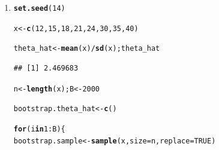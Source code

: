 \documentclass[11pt, a4paper]{article}\usepackage[]{graphicx}\usepackage[]{xcolor}
\makeatletter
\newcommand{\hlnum}[1]{\textcolor[rgb]{0.686,0.059,0.569}{#1}}%
\newcommand{\hlopt}[1]{\textcolor[rgb]{0,0,0}{#1}}%
\newcommand{\hldef}[1]{\textcolor[rgb]{0.345,0.345,0.345}{#1}}%
\newcommand{\hlkwa}[1]{\textcolor[rgb]{0.161,0.373,0.58}{\textbf{#1}}}%
\newcommand{\hlkwb}[1]{\textcolor[rgb]{0.69,0.353,0.396}{#1}}%
\newcommand{\hlkwc}[1]{\textcolor[rgb]{0.333,0.667,0.333}{#1}}%
\newcommand{\hlkwd}[1]{\textcolor[rgb]{0.737,0.353,0.396}{\textbf{#1}}}%
\newenvironment{kframe}{%
 \def\at@end@of@kframe{}%
 \ifinner\ifhmode%
  \def\at@end@of@kframe{\end{minipage}}%
  \begin{minipage}{\columnwidth}%
 \fi\fi%
 \def\FrameCommand##1{\hskip\@totalleftmargin \hskip-\fboxsep
 \colorbox{shadecolor}{##1}\hskip-\fboxsep
     \hskip-\linewidth \hskip-\@totalleftmargin \hskip\columnwidth}%
 \MakeFramed {\advance\hsize-\width
   \@totalleftmargin\z@ \linewidth\hsize
   \@setminipage}}%
 {\par\unskip\endMakeFramed%
 \at@end@of@kframe}
\newenvironment{knitrout}{}{} %
\makeatother
\begin{document}
\begin{enumerate}

\item[\scalebox{2.0}{\twemoji{keycap: 1}}]



\begin{knitrout}
\color{fgcolor}\begin{kframe}
\begin{alltt}
\hlkwd{set.seed}\hldef{(}\hlnum{14}\hldef{)}
\end{alltt}
\end{kframe}
\end{knitrout}

\begin{knitrout}
\color{fgcolor}\begin{kframe}
\begin{alltt}
\hldef{x} \hlkwb{<-} \hlkwd{c}\hldef{(}\hlnum{12}\hldef{,} \hlnum{15}\hldef{,} \hlnum{18}\hldef{,} \hlnum{21}\hldef{,} \hlnum{24}\hldef{,} \hlnum{30}\hldef{,} \hlnum{35}\hldef{,} \hlnum{40}\hldef{)}

\hldef{theta_hat} \hlkwb{<-} \hlkwd{mean}\hldef{(x)} \hlopt{/} \hlkwd{sd}\hldef{(x); theta_hat}
\end{alltt}
\begin{verbatim}
## [1] 2.469683
\end{verbatim}
\end{kframe}
\end{knitrout}

\begin{knitrout}
\color{fgcolor}\begin{kframe}
\begin{alltt}
\hldef{n} \hlkwb{<-} \hlkwd{length}\hldef{(x); B} \hlkwb{<-} \hlnum{2000}
\end{alltt}
\end{kframe}
\end{knitrout}

\begin{knitrout}
\color{fgcolor}\begin{kframe}
\begin{alltt}
\hldef{bootstrap.theta_hat} \hlkwb{<-} \hlkwd{c}\hldef{()}

\hlkwa{for}\hldef{(i} \hlkwa{in} \hlnum{1}\hlopt{:}\hldef{B)\{}
  \hldef{bootstrap.sample} \hlkwb{<-} \hlkwd{sample}\hldef{(x,} \hlkwc{size} \hldef{= n,} \hlkwc{replace} \hldef{=} \hlnum{TRUE}\hldef{)}


\end{alltt}
\end{kframe}
\end{knitrout}
\end{enumerate}
\end{document}
